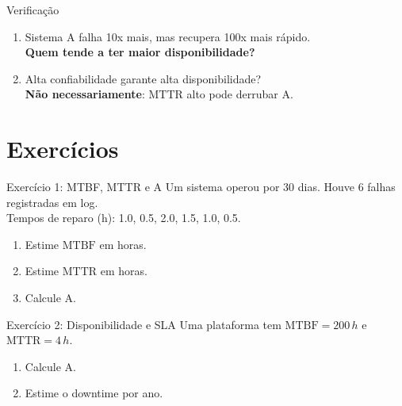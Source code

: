 \documentclass{beamer}
\newif\ifshowsolutions
\newcommand{\A}{\mathrm{A}}
\newcommand{\MTBF}{\mathrm{MTBF}}
\newcommand{\MTTR}{\mathrm{MTTR}}
\begin{document}
\begin{frame}{Verificação}

\begin{enumerate}
  \item Sistema A falha 10x mais, mas recupera 100x mais rápido.\\
  \textbf{Quem tende a ter maior disponibilidade?}
  \vspace{1em}
  \pause
  \item Alta confiabilidade garante alta disponibilidade?\\
  \pause
  \textbf{Não necessariamente}: \(\MTTR\) alto pode derrubar \(\A\).
\end{enumerate}

\end{frame}

\section{Exercícios}

\begin{frame}{Exercício 1: MTBF, MTTR e \texorpdfstring{$\A$}{A}}
Um sistema operou por 30 dias. Houve 6 falhas registradas em log.\\
Tempos de reparo (h): 1.0, 0.5, 2.0, 1.5, 1.0, 0.5.
\vspace{1em}
\begin{enumerate}
  \item Estime \(\MTBF\) em horas.
  \item Estime \(\MTTR\) em horas.
  \item Calcule \(\A\).
\end{enumerate}
\end{frame}

\ifshowsolutions
\begin{frame}{Gabarito Exercício 1}
\begin{itemize}
  \item Total de horas: \(30\times24=720\,h\)
  \item \(\MTBF\approx 720/6=120\,h\)
  \item \(\MTTR=(1+0.5+2+1.5+1+0.5)/6=6.5/6=1.083\,h\)
  \item \(\A\approx \frac{120}{120+1.083}=0.9911\approx 99.11\%\)
\end{itemize}
\end{frame}
\fi

\begin{frame}{Exercício 2: Disponibilidade e SLA}
Uma plataforma tem \(\MTBF=200\,h\) e \(\MTTR=4\,h\).

\begin{enumerate}
  \item Calcule \(\A\).
  \item Estime o downtime por ano.
\end{enumerate}
\end{frame}
\end{document}
